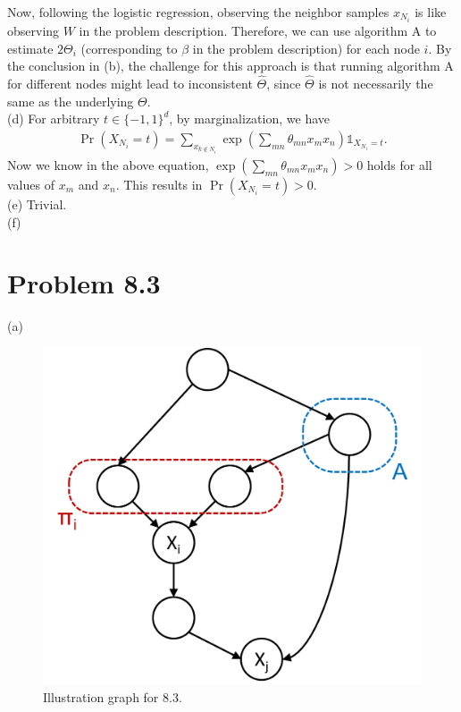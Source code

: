 \documentclass{article}
\newcommand{\qeds}{\hfill\qedsymbol}
\begin{document}
Now, following the logistic regression, observing the neighbor samples $x_{N_i}$ is like observing
$W$ in the problem description. Therefore, we can use algorithm A to estimate $2\Theta_i$
(corresponding to $\beta$ in the problem description) for each node $i$.
By the conclusion in (b), the challenge for this approach is that running algorithm A for different nodes
might lead to inconsistent $\hat{\Theta}$, since $\hat{\Theta}$ is not necessarily the same as the underlying
$\Theta$.
\\

\noindent
(d)
%
For arbitrary $t\in\{-1, 1\}^d$, by marginalization, we have
\begin{align*}
	\Pr(X_{N_i} = t) = \sum_{x_{k \notin N_i}}\exp\left(\sum_{mn}\theta_{mn} x_m x_n\right)
	\mathds{1}_{X_{N_i}=t}.
\end{align*}
Now we know in the above equation, $\exp\left(\sum_{mn}\theta_{mn} x_m x_n\right) > 0$ holds for all values of
$x_m$ and $x_n$. This results in $\Pr(X_{N_i} = t) > 0$. \qeds
\\

\noindent
(e)
%
Trivial.
\\

\noindent
(f)

\pagebreak
\section*{Problem 8.3}
(a)
%
\begin{figure}[h!]
  \centering
  \vspace{-0.3cm}
  \includegraphics[width=0.35\columnwidth]{83ab.pdf}
    \vspace{-0.1cm}
  \caption{Illustration graph for 8.3.}
  \label{f:83ab}
\end{figure}
%
\end{document}
